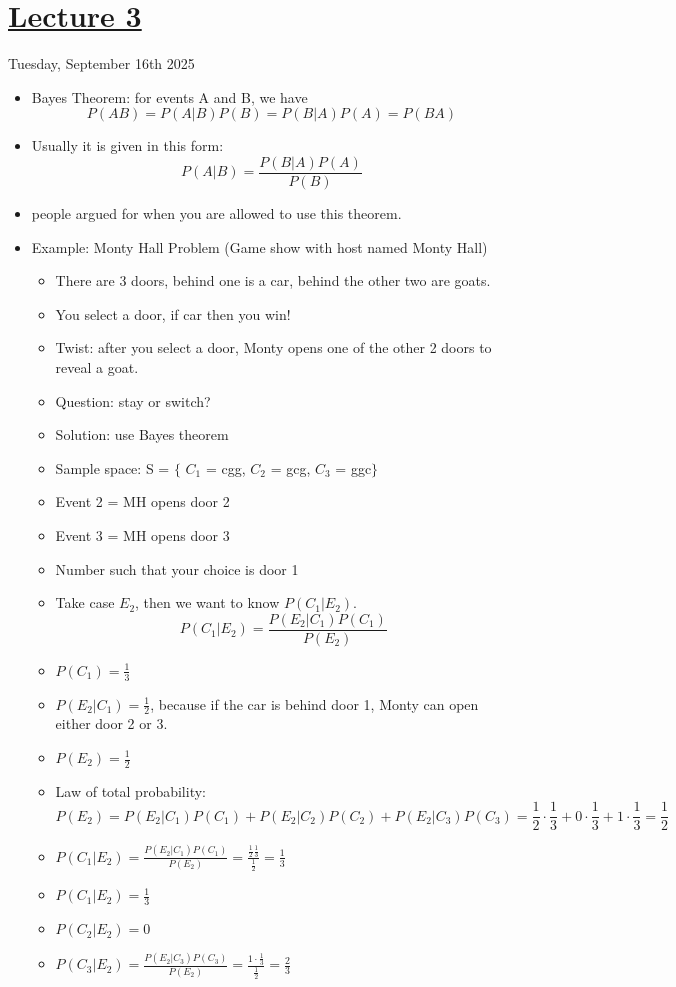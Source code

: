 \section[Lecture3]{\hyperlink{toc}{Lecture 3}}

Tuesday, September 16th 2025

\begin{itemize}
    \item Bayes Theorem: for events A and B, we have
    \[ \boxed{P(A B) = P(A|B) P(B) = P(B|A) P(A) = P(B A)} \]

    \item Usually it is given in this form:
    \[ P(A|B) = \frac{P(B|A) P(A)}{P(B)} \]

    \item people argued for when you are allowed to use this theorem.

    \item Example: Monty Hall Problem (Game show with host named Monty Hall)
    \begin{itemize}
        \item There are 3 doors, behind one is a car, behind the other two are goats.
        \item You select a door, if car then you win!
        \item Twist: after you select a door, Monty opens one of the other 2 doors to reveal a goat.
        \item Question: stay or switch?
        \item Solution: use Bayes theorem
        \item Sample space: S = $\{$ $C_1$ = cgg, $C_2$ = gcg, $C_3$ = ggc$\}$
        \item Event 2 = MH opens door 2
        \item Event 3 = MH opens door 3
        \item Number such that your choice is door 1
        \item Take case $E_2$, then we want to know $P(C_1|E_2)$.
        \[ P(C_1 | E_2) = \frac{P(E_2 | C_1) P(C_1)}{P(E_2)} \]
        \item $P(C_1)= \frac{1}{3}$
        \item $P(E_2 | C_1) = \frac{1}{2}$, because if the car is behind door 1, Monty can open either door 2 or 3.
        \item $P(E_2) = \frac{1}{2}$
        \item Law of total probability: \[ P(E_2) = P(E_2 | C_1) P(C_1) + P(E_2 | C_2) P(C_2) + P(E_2 | C_3) P(C_3)  = \frac{1}{2} \cdot \frac{1}{3} + 0 \cdot \frac{1}{3} + 1 \cdot \frac{1}{3} = \frac{1}{2} \]
        \item $P(C_1 | E_2) = \frac{P(E_2 | C_1) P(C_1)}{P(E_2)} = \frac{\frac{1}{2} \frac{1}{3}}{\frac{1}{2}} = \frac{1}{3}$
        \item $P(C_1 | E_2) = \frac{1}{3}$
        \item $P(C_2 |E_2) = 0$
        \item $P(C_3 |E_2) = \frac{P(E_2 | C_3) P(C_3)}{P(E_2)} = \frac{1 \cdot \frac{1}{3}}{\frac{1}{2}} = \frac{2}{3}$
    \end{itemize}


\end{itemize}
